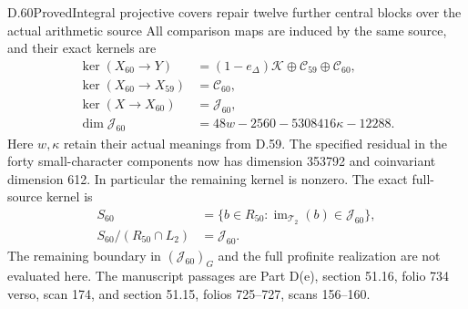 \begin{statement}{D.60}{Proved}{Integral projective covers repair twelve further central blocks over the actual arithmetic source}
All comparison maps are induced by the same
source, and their exact kernels are
\[
 \begin{aligned}
 \ker(X_{60}\to Y)
    &=(1-e_\Delta)\mathcal K
                   \oplus\mathcal C_{59}\oplus\mathcal C_{60},\\
 \ker(X_{60}\to X_{59})&=\mathcal C_{60},\\
 \ker(X\to X_{60})&=\mathcal J_{60},\\
 \dim\mathcal J_{60}
    &=48w-2560-5308416\kappa-12288.
 \end{aligned}
 \tag{D.60.8}
\]
Here \(w,\kappa\) retain their actual meanings
from D.59. The specified residual in the
forty small-character components now has
dimension 353792 and coinvariant dimension
612. In particular the remaining kernel is
nonzero. The exact full-source kernel is
\[
 \begin{aligned}
 S_{60}&=\{b\in R_{50}:
          \operatorname{im}_{\mathcal T_2}(b)\in\mathcal J_{60}\},\\
 S_{60}/(R_{50}\cap L_2)&=\mathcal J_{60}.
 \end{aligned}
 \tag{D.60.9}
\]
The remaining boundary in
\((\mathcal J_{60})_G\) and the full profinite
realization are not evaluated here.
The manuscript passages are Part D(e),
section 51.16, folio 734 verso, scan 174,
and section 51.15, folios 725--727,
scans 156--160.
\end{statement}
